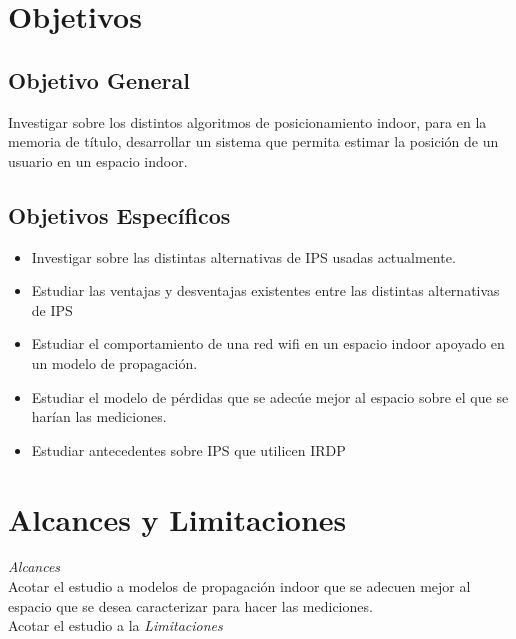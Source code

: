 \section{Objetivos}
\subsection{Objetivo General}

Investigar sobre los distintos algoritmos de posicionamiento indoor, para en la memoria de título, desarrollar un sistema que permita estimar la posición de un usuario en un espacio indoor.

\subsection{Objetivos Específicos}
\begin{itemize}
 \item {Investigar sobre las distintas alternativas de \ac{IPS} usadas actualmente.}
\item{Estudiar las ventajas y desventajas existentes entre las distintas alternativas de \ac{IPS}}
\item{Estudiar el comportamiento de una red wifi en un espacio indoor apoyado en un modelo de propagación.}
 \item {Estudiar el modelo de pérdidas que se adecúe mejor al espacio sobre el que se harían las mediciones.}
\item{Estudiar antecedentes sobre IPS que utilicen \ac{IRDP}}
\end{itemize}

\section{Alcances y Limitaciones}
\textit{Alcances}\\

Acotar el estudio a modelos de propagación indoor que se adecuen mejor al espacio que se desea caracterizar para hacer las mediciones.\\
Acotar el estudio a la 
\textit{Limitaciones}\\


